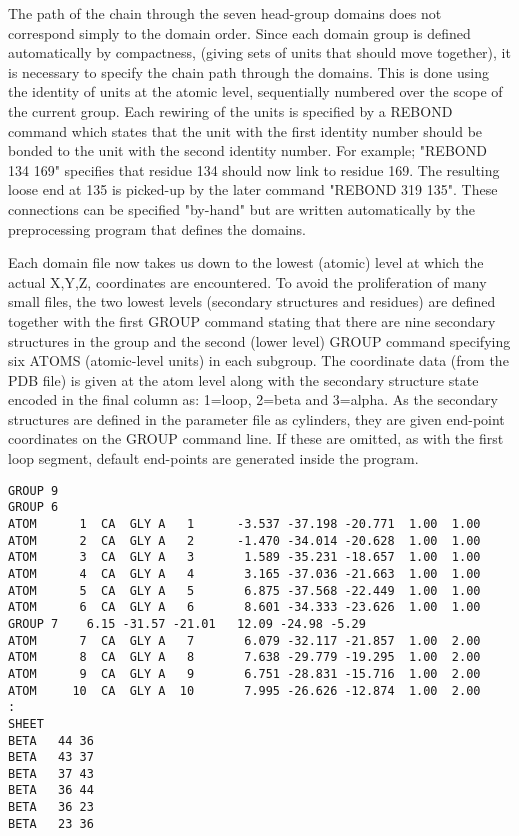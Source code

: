 The path of the chain through the seven head-group domains does not correspond simply
to the domain order.  Since each domain group is defined automatically by compactness,
(giving sets of units that should move together), it is necessary to specify the 
chain path through the domains.  This is done using the identity of units
at the atomic level, sequentially numbered over the scope of the current group. 
Each rewiring of the units is specified by a REBOND command which states that the
unit with the first identity number should be bonded to the unit with the second 
identity number.  For example; "REBOND 134 169" specifies that residue 134 should
now link to residue 169.  The resulting loose end at 135 is picked-up by the later
command "REBOND 319 135".   These connections can be specified "by-hand" but are
written automatically by the preprocessing program that defines the domains.

Each domain file now takes us down to the lowest (atomic) level at which the actual
X,Y,Z, coordinates are encountered.   To avoid the proliferation of many small files,
the two lowest levels (secondary structures and residues) are defined together with
the first GROUP command stating that there are nine secondary structures in the 
group and the second (lower level) GROUP command specifying six ATOMS (atomic-level
units) in each subgroup.   The coordinate data (from the PDB file) is given at the
atom level along with the secondary structure state encoded in the final column as:
1=loop, 2=beta and 3=alpha.   As the secondary structures are defined in the
parameter file as cylinders, they are given end-point coordinates on the GROUP
command line.  If these are omitted, as with the first loop segment, default 
end-points are generated inside the program.

\begin{verbatim}
GROUP 9
GROUP 6 
ATOM      1  CA  GLY A   1      -3.537 -37.198 -20.771  1.00  1.00
ATOM      2  CA  GLY A   2      -1.470 -34.014 -20.628  1.00  1.00
ATOM      3  CA  GLY A   3       1.589 -35.231 -18.657  1.00  1.00
ATOM      4  CA  GLY A   4       3.165 -37.036 -21.663  1.00  1.00
ATOM      5  CA  GLY A   5       6.875 -37.568 -22.449  1.00  1.00
ATOM      6  CA  GLY A   6       8.601 -34.333 -23.626  1.00  1.00
GROUP 7    6.15 -31.57 -21.01   12.09 -24.98 -5.29
ATOM      7  CA  GLY A   7       6.079 -32.117 -21.857  1.00  2.00
ATOM      8  CA  GLY A   8       7.638 -29.779 -19.295  1.00  2.00
ATOM      9  CA  GLY A   9       6.751 -28.831 -15.716  1.00  2.00
ATOM     10  CA  GLY A  10       7.995 -26.626 -12.874  1.00  2.00
:
SHEET
BETA   44 36
BETA   43 37
BETA   37 43
BETA   36 44
BETA   36 23
BETA   23 36
\end{verbatim}

